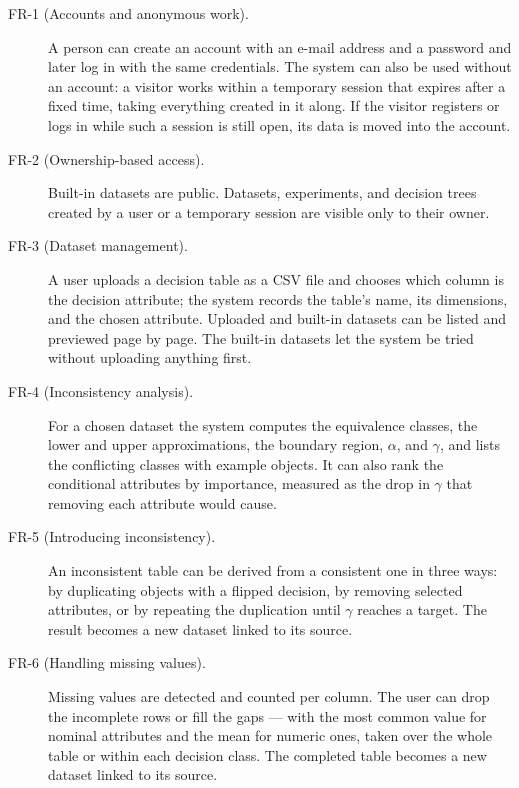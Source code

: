 \begin{description}

\item[FR-1 (Accounts and anonymous work).]
A person can create an account with an e-mail address and a password and later log in with the same credentials. The system can also be used without an account: a visitor works within a temporary session that expires after a fixed time, taking everything created in it along. If the visitor registers or logs in while such a session is still open, its data is moved into the account.

\item[FR-2 (Ownership-based access).]
Built-in datasets are public. Datasets, experiments, and decision trees created by a user or a temporary session are visible only to their owner.

\item[FR-3 (Dataset management).]
A user uploads a decision table as a CSV file and chooses which column is the decision attribute; the system records the table's name, its dimensions, and the chosen attribute. Uploaded and built-in datasets can be listed and previewed page by page. The built-in datasets let the system be tried without uploading anything first.

\item[FR-4 (Inconsistency analysis).]
For a chosen dataset the system computes the equivalence classes, the lower and upper approximations, the boundary region, $\alpha$, and $\gamma$, and lists the conflicting classes with example objects. It can also rank the conditional attributes by importance, measured as the drop in $\gamma$ that removing each attribute would cause.

\item[FR-5 (Introducing inconsistency).]
An inconsistent table can be derived from a consistent one in three ways: by duplicating objects with a flipped decision, by removing selected attributes, or by repeating the duplication until $\gamma$ reaches a target. The result becomes a new dataset linked to its source.

\item[FR-6 (Handling missing values).]
Missing values are detected and counted per column. The user can drop the incomplete rows or fill the gaps --- with the most common value for nominal attributes and the mean for numeric ones, taken over the whole table or within each decision class. The completed table becomes a new dataset linked to its source.


\end{description}
